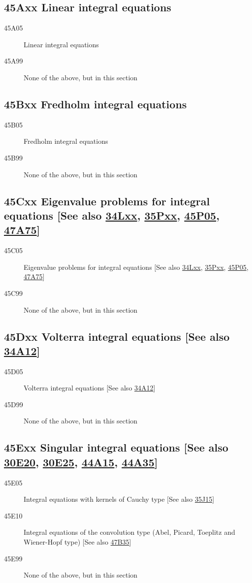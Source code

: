 \subsection*{45Axx  Linear integral equations }\label{45Axx}
\begin{description}
\item [45A05]\label{45A05} Linear integral equations
\item [45A99]\label{45A99} None of the above, but in this section
\end{description}
\subsection*{45Bxx  Fredholm integral equations }\label{45Bxx}
\begin{description}  
\item [45B05]\label{45B05} Fredholm integral equations
\item [45B99]\label{45B99} None of the above, but in this section
\end{description}
\subsection*{45Cxx  Eigenvalue problems for integral equations [See also \hyperref[34Lxx]{34Lxx}, \hyperref[35Pxx]{35Pxx}, \hyperref[45P05]{45P05}, \hyperref[47A75]{47A75}] }\label{45Cxx}
\begin{description}  
\item [45C05]\label{45C05} Eigenvalue problems for integral equations [See also \hyperref[34Lxx]{34Lxx}, \hyperref[35Pxx]{35Pxx}, \hyperref[45P05]{45P05}, \hyperref[47A75]{47A75}]
\item [45C99]\label{45C99} None of the above, but in this section
\end{description}
\subsection*{45Dxx  Volterra integral equations [See also \hyperref[34A12]{34A12}] }\label{45Dxx}
\begin{description}  
\item [45D05]\label{45D05} Volterra integral equations [See also \hyperref[34A12]{34A12}]
\item [45D99]\label{45D99} None of the above, but in this section
\end{description}
\subsection*{45Exx  Singular integral equations [See also \hyperref[30E20]{30E20}, \hyperref[30E25]{30E25}, \hyperref[44A15]{44A15}, \hyperref[44A35]{44A35}] }\label{45Exx}
\begin{description}  
\item [45E05]\label{45E05} Integral equations with kernels of Cauchy type [See also \hyperref[35J15]{35J15}]
\item [45E10]\label{45E10} Integral equations of the convolution type (Abel, Picard, Toeplitz and Wiener-Hopf type) [See also \hyperref[47B35]{47B35}]
\item [45E99]\label{45E99} None of the above, but in this section
\end{description}
